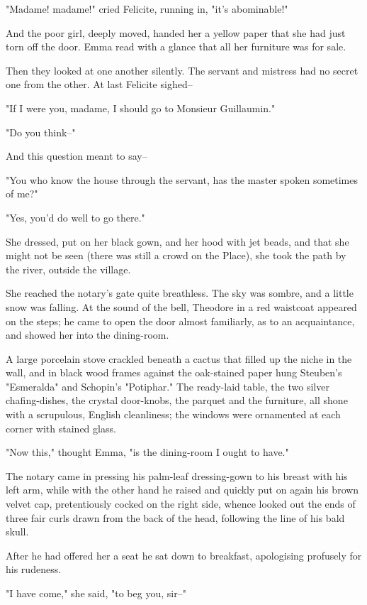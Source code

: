 \documentclass{tufte-book}
\begin{document}
"Madame! madame!" cried Felicite, running in, "it's abominable!"

And the poor girl, deeply moved, handed her a yellow paper that she had
just torn off the door. Emma read with a glance that all her furniture
was for sale.

Then they looked at one another silently. The servant and mistress had
no secret one from the other. At last Felicite sighed--

"If I were you, madame, I should go to Monsieur Guillaumin."

"Do you think--"

And this question meant to say--

"You who know the house through the servant, has the master spoken
sometimes of me?"

"Yes, you'd do well to go there."

She dressed, put on her black gown, and her hood with jet beads, and
that she might not be seen (there was still a crowd on the Place), she
took the path by the river, outside the village.

She reached the notary's gate quite breathless. The sky was sombre, and
a little snow was falling. At the sound of the bell, Theodore in a
red waistcoat appeared on the steps; he came to open the door almost
familiarly, as to an acquaintance, and showed her into the dining-room.

A large porcelain stove crackled beneath a cactus that filled up the
niche in the wall, and in black wood frames against the oak-stained
paper hung Steuben's "Esmeralda" and Schopin's "Potiphar." The
ready-laid table, the two silver chafing-dishes, the crystal door-knobs,
the parquet and the furniture, all shone with a scrupulous, English
cleanliness; the windows were ornamented at each corner with stained
glass.

"Now this," thought Emma, "is the dining-room I ought to have."

The notary came in pressing his palm-leaf dressing-gown to his breast
with his left arm, while with the other hand he raised and quickly put
on again his brown velvet cap, pretentiously cocked on the right side,
whence looked out the ends of three fair curls drawn from the back of
the head, following the line of his bald skull.

After he had offered her a seat he sat down to breakfast, apologising
profusely for his rudeness.

"I have come," she said, "to beg you, sir--"
\end{document}

